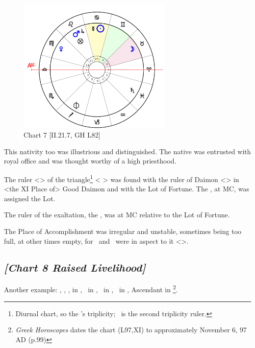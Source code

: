\clearpage
\begin{figure}
\centering

\includegraphics[width=0.68\textwidth]{charts/2_21_7}
\caption{Chart 7 [II.21.7, GH L82]}
\label{fig:chart07}
\end{figure}

This nativity too was illustrious and distinguished. The native was entrusted with royal office and was thought worthy of a high priesthood. 

The ruler <\Mars> of the triangle\footnote{Diurnal chart, so the \Sun's triplicity; \Mars\, is the second triplicity ruler.} <\Cancer\,\Scorpio\,\Pisces> was found with the ruler of Daimon <\Jupiter> in <the XI Place of> Good Daimon and with the Lot of Fortune. The \Sun, at MC, was assigned the Lot. 

The ruler of the exaltation, the \Moon, was at MC relative to the Lot of Fortune. 

The Place of Accomplishment was irregular and unstable, sometimes being too full, at other times empty, for \Saturn\, and \Venus\, were in aspect to it <\Square>.

\newpage

\subsection*{\textit{[Chart 8 Raised Livelihood]}}

Another example: \Sun, \Jupiter, \Mars, \Venus in \Scorpio, \Saturn\, in \Libra, \Moon\, in \Aries, \Mercury\, in \Sagittarius, Ascendant in \Leo
\footnote{\textit{Greek Horoscopes} dates the chart (L97,XI) to approximately November 6, 97 AD (p.99)}.

